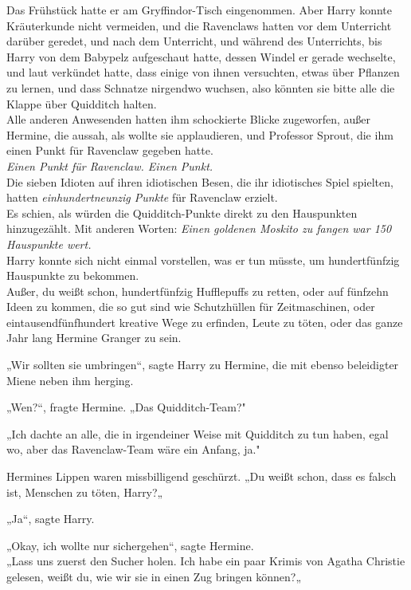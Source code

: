 {Das Frühstück hatte er am Gryffindor-Tisch eingenommen. Aber Harry konnte Kräuterkunde nicht vermeiden, und die Ravenclaws hatten vor dem Unterricht darüber geredet, und nach dem Unterricht, und während des Unterrichts, bis Harry von dem Babypelz aufgeschaut hatte, dessen Windel er gerade wechselte, und laut verkündet hatte, dass einige von ihnen versuchten, etwas über Pflanzen zu lernen, und dass Schnatze nirgendwo wuchsen, also könnten sie bitte alle die Klappe über Quidditch halten.\\ Alle anderen Anwesenden hatten ihm schockierte Blicke zugeworfen, außer Hermine, die aussah, als wollte sie applaudieren, und Professor Sprout, die ihm einen Punkt für Ravenclaw gegeben hatte.\\ \emph{Einen Punkt für Ravenclaw. Einen Punkt.}\\ Die sieben Idioten auf ihren idiotischen Besen, die ihr idiotisches Spiel spielten, hatten \emph{einhundertneunzig Punkte} für Ravenclaw erzielt.\\ Es schien, als würden die Quidditch-Punkte direkt zu den Hauspunkten hinzugezählt. Mit anderen Worten: \emph{Einen goldenen Moskito zu fangen war 150 Hauspunkte wert.}\\ Harry konnte sich nicht einmal vorstellen, was er tun müsste, um hundertfünfzig Hauspunkte zu bekommen.\\ Außer, du weißt schon, hundertfünfzig Hufflepuffs zu retten, oder auf fünfzehn Ideen zu kommen, die so gut sind wie Schutzhüllen für Zeitmaschinen, oder eintausendfünfhundert kreative Wege zu erfinden, Leute zu töten, oder das ganze Jahr lang Hermine Granger zu sein.

„Wir sollten sie umbringen“, sagte Harry zu Hermine, die mit ebenso beleidigter Miene neben ihm herging.

„Wen?“, fragte Hermine. „Das Quidditch-Team?"

„Ich dachte an alle, die in irgendeiner Weise mit Quidditch zu tun haben, egal wo, aber das Ravenclaw-Team wäre ein Anfang, ja."

Hermines Lippen waren missbilligend geschürzt. „Du weißt schon, dass es falsch ist, Menschen zu töten, Harry?„

„Ja“, sagte Harry.

„Okay, ich wollte nur sichergehen“, sagte Hermine.\\ „Lass uns zuerst den Sucher holen. Ich habe ein paar Krimis von Agatha Christie gelesen, weißt du, wie wir sie in einen Zug bringen können?„

}
